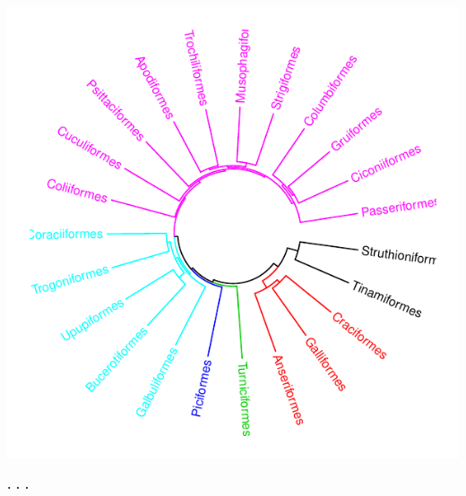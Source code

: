 \documentclass{article}\usepackage[]{graphicx}\usepackage[]{color}
\makeatletter
\def\maxwidth{ %
  \ifdim\Gin@nat@width>\linewidth
    \linewidth
  \else
    \Gin@nat@width
  \fi
}
\newenvironment{knitrout}{}{} %
\makeatother
\begin{document}
\begin{knitrout}
\color{fgcolor}

{\centering \includegraphics[width=\maxwidth]{figure/plot_circlize_dendo_2-1} 

}



\end{knitrout}
\begin{center}
\textbf{. . .}
\end{center}
\end{document}
